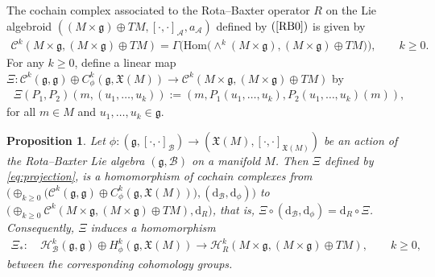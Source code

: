 \documentclass[pdftex]{sigma}%
\numberwithin{equation}{section}
\newtheorem{pro}[thm]{Proposition}
\newcommand{\g}{\mathfrak g}
\newcommand{\huaA}{\mathcal{A}}
\newcommand{\huaB}{\mathcal{B}}
\newcommand{\huaC}{\mathcal{C}}
\newcommand{\huaH}{\mathcal{H}}
\newcommand{\frkX}{\mathfrak X}
\newcommand{\dM}{\mathrm{d}}
\newcommand{\Hom}{\mathrm{Hom}}
\begin{document}
The cochain complex associated to the Rota--Baxter operator $R$ on the Lie algebroid $((M \times\g)\allowbreak\oplus TM,[\cdot,\cdot]_{\huaA},a_{\huaA})$ defined by $(\ref{RB0})$ is given by
\begin{gather*}
\huaC^k(M\times \g,(M \times\g)\oplus TM)=\Gamma\big(\Hom\big({\wedge}^k(M\times \g),(M \times\g)\oplus TM\big)\big),\qquad k\geq0.
\end{gather*}
For any $k\geq 0$, define a linear map $\Xi\colon \huaC^k(\g,\g)\oplus C_\phi^k(\g,\mathfrak{X}(M))\to \huaC^k(M\times \g,(M \times\g)\oplus TM)$ by
\begin{gather}\label{eq:projection}
\Xi(P_1,P_2)(m,(u_1,\dots, u_k)):=(m,P_1(u_1,\dots, u_k),P_2(u_1,\dots, u_k)(m)),
\end{gather}
for all $m\in M$ and $u_1,\dots,u_k\in \g.$

\begin{pro}
	Let $\phi \colon (\g, [\cdot,\cdot]_\huaB)\to(\mathfrak{X}(M),[\cdot,\cdot]_{\frkX(M)})$ be an action of the Rota--Baxter Lie algebra $(\g,\huaB)$ on a manifold $M$. Then $\Xi$ defined by \eqref{eq:projection}, is a homomorphism of cochain complexes from $\big({\oplus}_{k\geq 0}\big(\huaC^k(\g,\g)\oplus C_\phi^k(\g,\mathfrak{X}(M))\big),(\dM_\huaB,\dM_\phi)\big)$ to $\big({\oplus}_{k\geq 0}\huaC^k(M\times \g,(M \times\g)\oplus TM),\dM_R\big)$, that is, $\Xi\circ(\dM_\huaB,\dM_\phi)=\dM_R\circ \Xi$. Consequently, $\Xi$ induces a homomorphism
\begin{gather*}
\Xi_\ast\colon\quad \huaH_{\huaB}^k(\g,\g)\oplus H_{\phi}^k(\g,\mathfrak{X}(M))\to \huaH_{R}^k(M\times \g,(M \times\g)\oplus TM),\qquad k\geq0,
\end{gather*}
	between the corresponding cohomology groups.
\end{pro}
\end{document}
